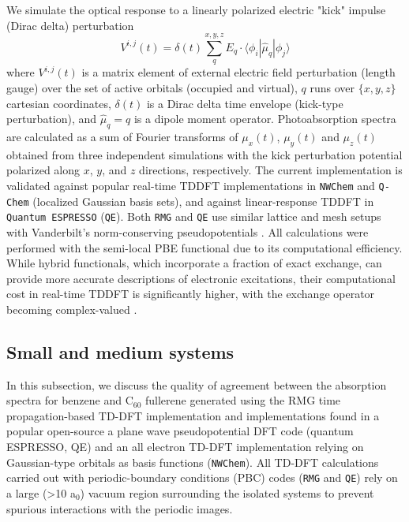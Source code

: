 \documentclass[journal=jctcce,manuscript=article,etalmode=truncate,maxauthors=10,layout=twocolumn,9pt]{achemso}   %
\begin{document}
We simulate the optical response to a linearly polarized electric "kick" impulse (Dirac delta) perturbation
\begin{equation}
V^{i,j}(t) =   \delta(t) \sum_{q}^{x,y,z}  E_q\cdot \langle \phi_i| \hat \mu_q | \phi_j \rangle
\end{equation} 
where  $ V^{i,j}(t)$ is a matrix element of external  electric field  perturbation (length gauge) over  the  set of active orbitals (occupied and virtual), $q$ runs over $\{x,y,z\}$ cartesian coordinates,    $\delta(t)$ is  a Dirac delta time envelope (kick-type perturbation), and  $\hat \mu_q= q$ is a dipole moment operator. 
Photoabsorption spectra are calculated as  a sum of Fourier transforms of  $\mu_x(t)$,  $\mu_y(t)$   and  $\mu_z(t)$  obtained from  three independent simulations with the kick perturbation potential polarized along $x$, $y$, and $z$  directions, respectively.
 The current implementation is validated against popular real-time TDDFT implementations in \texttt{NWChem} and \texttt{Q-Chem} (localized Gaussian basis sets), and against linear-response TDDFT in \texttt{Quantum ESPRESSO} (\texttt{QE}). Both \texttt{RMG} and \texttt{QE} use similar lattice and mesh setups with Vanderbilt's norm-conserving pseudopotentials \cite{Vanderbilt}.
All calculations were performed with the semi-local PBE functional \cite{pbe}  due to its computational efficiency. While hybrid functionals, which incorporate a fraction of exact exchange, can provide more accurate descriptions of electronic excitations, their computational cost in real-time TDDFT is significantly higher,  with the exchange operator becoming complex-valued \cite{lvnmd}.



\subsection{Small and medium  systems}



In this subsection, we discuss the quality of agreement between the absorption spectra for benzene and C$_{60}$ fullerene generated using the RMG time propagation-based TD-DFT implementation and implementations found in a popular open-source a plane wave pseudopotential DFT code (quantum ESPRESSO, QE)\cite{Vanderbilt,QE-TDDFT2,QE} and an all electron TD-DFT implementation relying on Gaussian-type orbitals as basis functions (\texttt{NWChem})\cite{lopata-2011}. All TD-DFT calculations carried out with periodic-boundary conditions (PBC) codes (\texttt{RMG} and \texttt{QE}) rely on a large (>10 a$_0$) vacuum region surrounding the isolated systems to prevent spurious interactions with the periodic images.  
\end{document}
